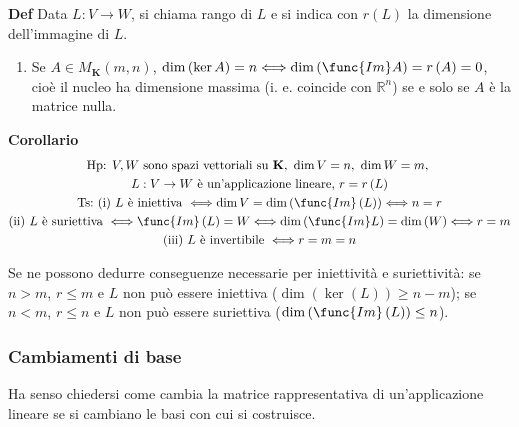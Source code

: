\documentclass{article}
\begin{document}
\textbf{Def} Data $L:V\rightarrow W$, si chiama rango di $L$ e si indica con 
$r\left( L\right) $ la dimensione dell'immagine di $L$.

\begin{enumerate}
\item Se $A\in M_{\mathbf{K}}\left( m,n\right) $, $\dim \left( \ker A\right)
=n\Longleftrightarrow \dim \left( \func{Im}A\right) =r\left( A\right) =0$,
cio\`{e} il nucleo ha dimensione massima (i. e. coincide con $%
\mathbb{R}
^{n}$) se e solo se $A$ \`{e} la matrice nulla.
\end{enumerate}

\textbf{Corollario}%
\begin{gather*}
\text{Hp}\text{: }V,W\text{ sono spazi vettoriali su }\mathbf{K}\text{, }%
\dim V=n\text{, }\dim W=m\text{, } \\
L:V\rightarrow W\text{ \`{e} un'applicazione lineare, }r=r\left( L\right) \\
\text{Ts}\text{:}\text{ (i) }L\text{ \`{e} iniettiva }\Longleftrightarrow
\dim V=\dim \left( \func{Im}\left( L\right) \right) \Longleftrightarrow n=r
\\
\text{(ii) }L\text{ \`{e} suriettiva }\Longleftrightarrow \func{Im}\left(
L\right) =W\Longleftrightarrow \dim \left( \func{Im}L\right) =\dim \left(
W\right) \Longleftrightarrow r=m \\
\text{(iii) }L\text{ \`{e} invertibile }\Longleftrightarrow r=m=n
\end{gather*}

Se ne possono dedurre conseguenze necessarie per iniettivit\`{a} e
suriettivit\`{a}: se $n>m$, $r\leq m$ e $L$ non pu\`{o} essere iniettiva ($%
\dim \left( \ker \left( L\right) \right) \geq n-m$); se $n<m$, $r\leq n$ e $%
L $ non pu\`{o} essere suriettiva ($\dim \left( \func{Im}\left( L\right)
\right) \leq n$).


\subsubsection{Cambiamenti di base}

Ha senso chiedersi come cambia la matrice rappresentativa di un'applicazione
lineare se si cambiano le basi con cui si costruisce.
\end{document}

